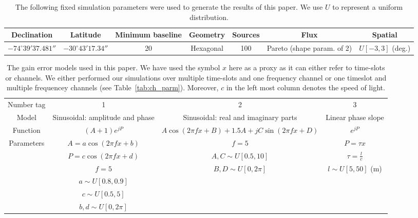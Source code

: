 \documentclass[useAMS,usenatbib]{mn2e}
\begin{document}


\begin{table}
\centering
\caption{The following fixed simulation parameters were used to generate the results of this paper. We use $U$ to represent 
a uniform distribution.}
\begin{tabular}{|c c c c c c c|} 
\hline
Declination & Latitude & Minimum baseline & Geometry& Sources & Flux & Spatial \\
\hline 
\hline
 $-74^{\circ}39'37.481''$ & $-30^{\circ}43'17.34''$ & 20 & Hexagonal &100 & Pareto (shape param. of 2) & $U[-3,3]$ (deg.) 
\end{tabular}
\label{tab:fixed_parm}
\end{table}

\begin{table}
\centering
\caption{The gain error models used in this paper. We have used the symbol $x$ here as a proxy as it can either refer to time-slots or channels. We either
performed our simulations over multiple time-slots and one frequency channel or one timeslot and multiple frequencey channels (see Table~\ref{tab:ch_parm}). Moreover, $c$ in the left most column denotes the speed of light.}
\begin{tabular}{|c c c c|} 
\hline
Number tag & 1 & 2 & 3\\
Model & Sinusoidal: amplitude and phase & Sinusoidal: real and imaginary parts & Linear phase slope \\ [0.5ex] 
\hline\hline
Function & $(A+1)e^{jP}$ & $A\cos(2\pi fx+B)+1.5A+jC\sin(2\pi fx+D)$ & $e^{jP}$ \\ 
\hline
Parameters & $A=a\cos(2\pi fx +b)$  & $f=5$ & $P=\tau x$ \\
 & $P =c \cos(2\pi fx +d)$ & $A,C\sim U[0.5,10]$ & $\tau = \frac{l}{c}$ \\
 & $f=5$ & $B,D\sim U[0,2\pi]$ &  $l\sim U[5,50]$ (m)\\
 & $a\sim U[0.8,0.9]$ &  & \\ 
 & $c\sim U[0.5,5]$ &  &  \\ 
 & $b,d\sim U[0,2\pi]$ &  &  \\ 
\hline
\end{tabular}
\label{tab:gain_parm}
\end{table}
\end{document}
